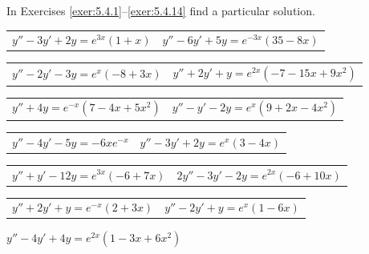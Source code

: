\exercises In Exercises \ref{exer:5.4.1}--\ref{exer:5.4.14} find a particular solution.

\begin{exerciselist}
  \begin{tabular}[t]{@{}p{168pt}@{}p{168pt}}
    \item\label{exer:5.4.1} $y''-3y'+2y=e^{3x}(1+x)$ & \vspace*{10pt}
    \item\label{exer:5.4.2} $y''-6y'+5y=e^{-3x}(35-8x)$
  \end{tabular}

  \begin{tabular}[t]{@{}p{168pt}@{}p{168pt}}
    \item\label{exer:5.4.3} $y''-2y'-3y=e^{x}(-8+3x)$ &
    \item\label{exer:5.4.4} $y''+2y'+y=e^{2x}(-7-15x+9x^{2})$
  \end{tabular}

  \begin{tabular}[t]{@{}p{168pt}@{}p{168pt}}
    \item\label{exer:5.4.5} $y''+4y=e^{-x}(7-4x+5x^{2})$ &
    \item\label{exer:5.4.6} $y''-y'-2y=e^{x}(9+2x-4x^{2})$
  \end{tabular}

  \begin{tabular}[t]{@{}p{168pt}@{}p{168pt}}
    \item\label{exer:5.4.7} $y''-4y'-5y=-6xe^{-x}$ &
    \item\label{exer:5.4.8} $y''-3y'+2y=e^{x}(3-4x)$
  \end{tabular}

  \begin{tabular}[t]{@{}p{168pt}@{}p{168pt}}
    \item\label{exer:5.4.9} $y''+y'-12y=e^{3x}(-6+7x)$ &
    \item\label{exer:5.4.10} $2y''-3y'-2y=e^{2x}(-6+10x)$
  \end{tabular}

  \begin{tabular}[t]{@{}p{168pt}@{}p{168pt}}
    \item\label{exer:5.4.11} $y''+2y'+y=e^{-x}(2+3x)$ &
    \item\label{exer:5.4.12} $y''-2y'+y=e^{x}(1-6x)$
  \end{tabular}

  \item\label{exer:5.4.13} $y''-4y'+4y=e^{2x}(1-3x+6x^{2})$


\end{exerciselist}

